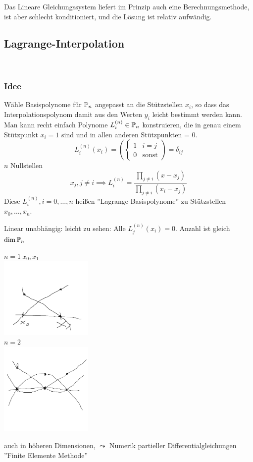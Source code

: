 \documentclass[../Skript.tex]{subfiles}
\begin{document}
Das Lineare Gleichungssystem liefert im Prinzip auch eine Berechnungsmethode, ist aber schlecht konditioniert, und die 
Lösung ist relativ aufwändig.

\subsection{Lagrange-Interpolation}\hfill\\
\subsubsection*{Idee} Wähle Basispolynome für $\mathbb{P}_n$ angepasst an die Stützstellen $x_i$, so dass das 
Interpolationspolynom damit aus den Werten $y_i$ leicht bestimmt werden kann. Man kann 
recht einfach Polynome $L_i^{(n)}\in\mathbb{P}_n$ konstruieren, die in genau einem Stützpunkt $x_i = 1$ sind und 
in allen anderen Stützpunkten = 0. $$L_i^{(n)}(x_i) = \left(\begin{cases}
    1& i=j\\ 0& \text{sonst}
\end{cases}\right) = \delta_{ij}$$
 $n$ Nullstellen $$x_j, j\neq i \implies L_i^{(n)} = \frac{\displaystyle\prod_{j\neq i}(x-x_j)}{\displaystyle\prod_{j\neq 
 i}(x_i-x_j)}$$
Diese $L_i^{(n)}, i=0, \dots, n$ heißen ''Lagrange-Basispolynome'' zu Stützstellen $x_0,\dots,x_n$.

Linear unabhängig: leicht zu sehen: Alle $L_j^{(n)}(x_i) = 0$. Anzahl ist gleich $\dim \mathbb{P}_n$

\begin{example} $n=1\  x_0,x_1$ \\
\includegraphics[width=45mm]{../Bilder/x_1_2.png}\\
$n=2$\\
\includegraphics[width=45mm]{../Bilder/x_1_2_3.png}\\
\end{example}
\begin{remark}
auch in höheren Dimensionen, $\leadsto$ Numerik partieller Differentialgleichungen ''Finite Elemente Methode'' \\ 
\end{remark}
\end{document}
